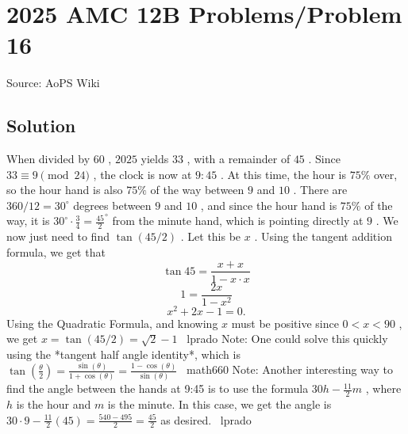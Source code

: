\documentclass[12pt]{article}
\begin{document}
\section*{{2025 AMC 12B Problems/Problem 16}}
Source: AoPS Wiki

\subsection*{Solution}
When divided by $60$ , $2025$ yields $33$ , with a remainder of $45$ . Since $33 \equiv 9 \pmod{24}$ , the clock is now at $9:45$ . At this time, the hour is $75\%$ over, so the hour hand is also $75\%$ of the way between $9$ and $10$ . There are $360/12 = 30 ^\circ$ degrees between $9$ and $10$ , and since the hour hand is $75\%$ of the way, it is $30^\circ \cdot \frac{3}{4} = \frac{45}{2}^\circ$ from the minute hand, which is pointing directly at $9$ . We now just need to find $\tan{(45/2)}$ . Let this be $x$ . Using the tangent addition formula, we get that \[\tan{45} = \frac{x + x}{1 - x\cdot x}\] \[1 = \frac{2x}{1-x^2}\] \[x^2+2x-1 = 0.\] Using the Quadratic Formula, and knowing $x$ must be positive since $0 < x < 90$ , we get $x = \tan{(45/2)}= \boxed{\sqrt{2}-1}$ ~lprado Note: One could solve this quickly using the *tangent half angle identity*, which is $\tan(\frac{\theta}{2}) = \frac{\sin(\theta)}{1+\cos(\theta)} = \frac{1-\cos(\theta)}{\sin(\theta)}$ ~math660 Note: Another interesting way to find the angle between the hands at 9:45 is to use the formula $30h - \frac{11}{2}m$ , where $h$ is the hour and $m$ is the minute. In this case, we get the angle is $30 \cdot 9 - \frac{11}{2}(45) = \frac{540-495}{2} = \frac{45}{2}$ as desired. ~lprado
\end{document}
